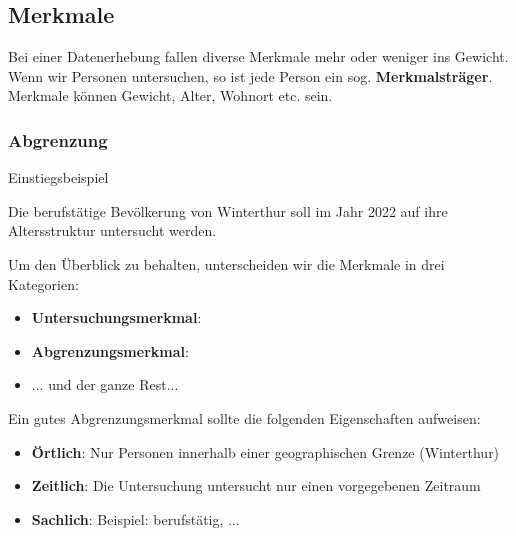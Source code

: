\subsection{Merkmale}
Bei einer Datenerhebung fallen diverse Merkmale mehr oder weniger ins
Gewicht. Wenn wir Personen untersuchen, so ist jede Person ein
sog. \textbf{Merkmalsträger}. Merkmale können Gewicht, Alter, Wohnort
etc. sein.

\subsubsection{Abgrenzung}
Einstiegsbeispiel


Die berufstätige Bevölkerung von Winterthur soll im Jahr 2022 auf ihre
Altersstruktur untersucht werden.



\newpage
Um den Überblick zu behalten, unterscheiden wir die Merkmale in drei
Kategorien:
\begin{itemize}
\item \textbf{Untersuchungsmerkmal}:
\item \textbf{Abgrenzungsmerkmal}:
\item ... und der ganze Rest...

\end{itemize}

Ein gutes Abgrenzungsmerkmal sollte die folgenden Eigenschaften
aufweisen:
\begin{itemize}
\item \textbf{Örtlich}: Nur Personen innerhalb einer geographischen
  Grenze (\zB Winterthur)
\item \textbf{Zeitlich}: Die Untersuchung untersucht nur einen vorgegebenen
Zeitraum
\item \textbf{Sachlich}: Beispiel: berufstätig, ...
\end{itemize}

